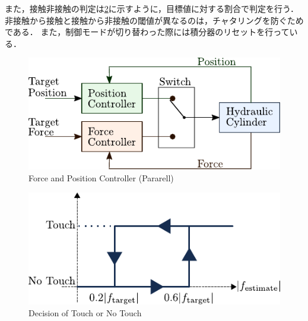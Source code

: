 また，接触非接触の判定は\figname\ref{fig5:touch_define}に示すように，目標値に対する割合で判定を行う．
非接触から接触と接触から非接触の閾値が異なるのは，チャタリングを防ぐためである．
また，制御モードが切り替わった際には積分器のリセットを行っている．

\begin{figure}[t]
    \centering
        \includegraphics[keepaspectratio, scale=1.0]{contents/IntegrationControl/figure/pararell_torqueandposition.pdf}
        \caption{Force and Position Controller (Pararell)}
        \label{fig5:pararell_torqueandposition}
\end{figure}

\begin{figure}[t]
    \centering
        \includegraphics[keepaspectratio, scale=1.0]{contents/IntegrationControl/figure/touch_define.pdf}
        \caption{Decision of Touch or No Touch}
        \label{fig5:touch_define}
\end{figure}

